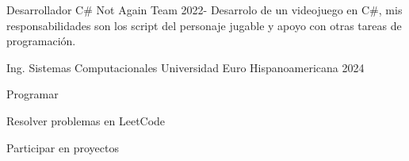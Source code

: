 \documentclass[11pt]{spidercv}
\begin{document}
    \begin{MainPart}

    \Experience
        {\ColorHighlight}
		{Desarrollador C\#}
		{Not Again Team}
        {2022-\faUndo}
        {
	        Desarrolo de un videojuego en C\#, mis responsabilidades son		    los script del personaje jugable y apoyo con otras tareas de                programación.   
        }

    
    \Experience
        {\ColorHighlight}
		{Ing. Sistemas Computacionales}
		{Universidad Euro Hispanoamericana}
        {2024}
        {   
 		
        }

    \vspace*{0.5cm}
    \begin{DoubleColumns}
        \begin{ItemList}{\ColorHighlight}
            \item [] Programar
            \item [] Resolver problemas en LeetCode
        \end{ItemList}
        \nextcolumn
        \begin{ItemList}{\ColorHighlight}
            \item [] Participar en proyectos
        \end{ItemList}
    \end{DoubleColumns}

    \end{MainPart}

    
\end{document}
